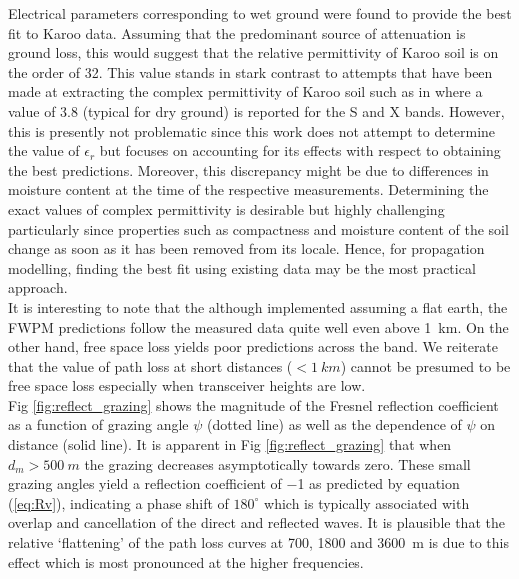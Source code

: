 \documentclass[10pt,journal,twoside]{IEEEtran}
\begin{document}
Electrical parameters corresponding to wet ground were found to provide the best fit to Karoo data. Assuming that the predominant source of attenuation is ground loss, this would suggest that the relative permittivity of Karoo soil is on the order of \num{32}. This value stands in stark contrast to attempts that have been made at extracting the complex permittivity of Karoo soil such as in \cite{Braam2011} where a value of \num{3.8} (typical for dry ground) is reported for the S and X bands. However, this is presently not problematic since this work does not attempt to determine the value of $\epsilon_r$ but focuses on accounting for its effects with respect to obtaining the best predictions. Moreover, this discrepancy might be due to differences in moisture content at the time of the respective measurements. Determining the exact values of complex permittivity is desirable but highly challenging particularly since properties such as compactness and moisture content of the soil change as soon as it has been removed from its locale. Hence, for propagation modelling, finding the best fit using existing data may be the most practical approach.\\
It is interesting to note that the although implemented assuming a flat earth, the FWPM predictions follow the measured data quite well even above \SI{1}{km}. On the other hand, free space loss yields poor predictions across the band. We reiterate that the value of path loss at short distances ($<\SI{1}{km}$) cannot be presumed to be free space loss especially when transceiver heights are low.\\
Fig \ref{fig:reflect_grazing} shows the magnitude of the Fresnel reflection coefficient as a function of grazing angle $\psi$ (dotted line) as well as the dependence of $\psi$ on distance (solid line). It is apparent in Fig \ref{fig:reflect_grazing} that when $d_m>\SI{500}{m}$ the grazing decreases asymptotically towards zero. These small grazing angles yield a reflection coefficient of \num{-1} as predicted by equation (\ref{eq:Rv}), indicating a phase shift of $180^\circ$ which is typically associated with overlap and cancellation of the direct and reflected waves. It is plausible that the relative `flattening' of the path loss curves at \SI{700}{}, \SI{1800}{} and \SI{3600}{m} is due to this effect which is most pronounced at the higher frequencies. %
%
\end{document}
